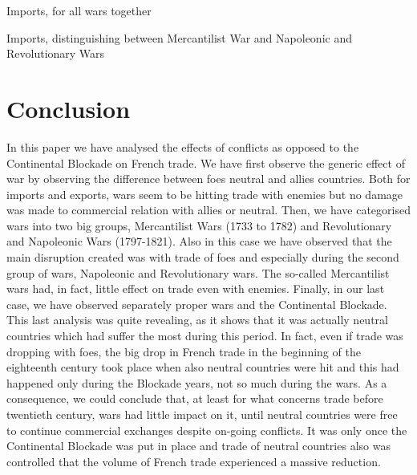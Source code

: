\documentclass[12pt,a4paper,notitlepage,english]{article}
\begin{document}
\begin{table}
\begin{center}
\caption {Imports, for all wars together} 
\label{table:import_class_war}
\renewcommand{\arraystretch}{0.6}

\end{center}
\end{table}
\begin{table}
\begin{center}
\caption {Imports, distinguishing between Mercantilist War and Napoleonic and Revolutionary Wars} \label{table:import_class_merc}
\renewcommand{\arraystretch}{0.6}

\end{center}
\end{table}

\section{Conclusion}
In this paper we have analysed the effects of conflicts as opposed to the Continental Blockade on French trade. We have first observe the generic effect of war by observing the difference between foes neutral and allies countries. Both for imports and exports, wars seem to be hitting trade with enemies but no damage was made to commercial relation with allies or neutral. Then, we have categorised wars into two big groups, Mercantilist Wars (1733 to 1782) and Revolutionary and Napoleonic Wars (1797-1821). Also in this case we have observed that the main disruption created was with trade of foes and especially during the second group of wars, Napoleonic and Revolutionary wars. The so-called Mercantilist wars had, in fact, little effect on trade even with enemies. Finally, in our last case, we have observed separately proper wars and the Continental Blockade. This last analysis was quite revealing, as it shows that it was actually neutral countries which had suffer the most during this period. In fact, even if trade was dropping with foes, the big drop in French trade in the beginning of the eighteenth century took place when also neutral countries were hit and this had happened only during the Blockade years, not so much during the wars. As a consequence, we could conclude that, at least for what concerns trade before twentieth century, wars had little impact on it, until neutral countries were free to continue commercial exchanges despite on-going conflicts. It was only once the Continental Blockade was put in place and trade of neutral countries also was controlled that the volume of French trade experienced a massive reduction. 


\pagebreak

\renewcommand{\baselinestretch}{1.0}\normalsize



\end{document}
